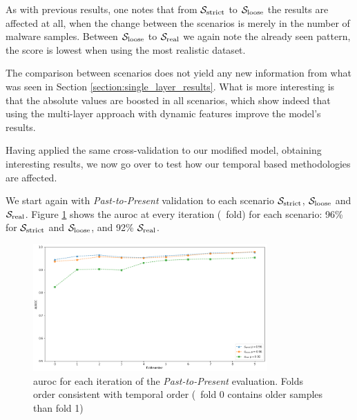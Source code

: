 
As with previous results, one notes that from $\mathcal{S}_{\mathrm{strict}}$ to $\mathcal{S}_{\mathrm{loose}}$ the results are affected at all, when the change between the scenarios is merely in the number of malware samples.
Between $\mathcal{S}_{\mathrm{loose}}$ to $\mathcal{S}_{\mathrm{real}}$ we again note the already seen pattern, the score is lowest when using the most realistic dataset.

The comparison between scenarios does not yield any new information from what was seen in Section \ref{section:single_layer_results}.
What is more interesting is that the absolute values are boosted in all scenarios, which show indeed that using the multi-layer approach with dynamic features improve the model's results.

Having applied the same cross-validation to our modified model, obtaining interesting results, we now go over to test how our temporal based methodologies are affected.

\medskip

We start again with \textit{Past-to-Present} validation to each scenario $\mathcal{S}_{\mathrm{strict}}$, $\mathcal{S}_{\mathrm{loose}}$ and $\mathcal{S}_{\mathrm{real}}$.
Figure \ref{fig:pastpresent_modified} shows the \gls{auroc} at every iteration (\ie\ fold) for each scenario: 96\% for $\mathcal{S}_{\mathrm{strict}}$ and $\mathcal{S}_{\mathrm{loose}}$, and 92\% $\mathcal{S}_{\mathrm{real}}$.

\begin{figure}[!htb]
	\centering
	\includegraphics[width=0.8\textwidth]{Figures/pastpresent_improved.png}
	\caption[Multi layer results for dynamic features in \textit{Past-to-Present}.]{\gls{auroc} for each iteration of the \textit{Past-to-Present} evaluation. Folds order consistent with temporal order (\ie\ fold 0 contains older samples than
		fold 1)}
	\label{fig:pastpresent_modified}
\end{figure}

